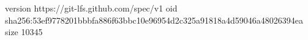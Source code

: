 version https://git-lfs.github.com/spec/v1
oid sha256:53ef9778201bbbfa886f63bbc10e96954d2c325a91818a4d59046a48026394ea
size 10345
